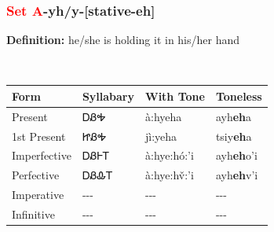 \subsubsection*{\textcolor{Red}{Set A}{-}\textbf{yh/y}{-}[stative-eh]}
\nopagebreak
\textbf{Definition: } he/she is holding it in his/her hand
\\[0.5em]
\begin{tabularx}{\textwidth}{l X X X}%
\toprule%
\textbf{Form}&\textbf{Syllabary}&\textbf{With Tone}&\textbf{Toneless}\\%
\midrule%
Present&ᎠᏰᎭ&à:hyeha&ayh\textbf{eh}a\\%
1st Present&ᏥᏰᎭ&jì:yeha&tsiy\textbf{eh}a\\%
Imperfective&ᎠᏰᎰᎢ&à:hye:hó:’i&ayh\textbf{eh}o'i\\%
Perfective&ᎠᏰᎲᎢ&à:hye:hv̌:’i&ayh\textbf{eh}v'i\\%
Imperative&{-}{-}{-}&{-}{-}{-}&{-}{-}{-}\\%
Infinitive&{-}{-}{-}&{-}{-}{-}&{-}{-}{-}\\%
\bottomrule%
\end{tabularx}
\\[1em]
